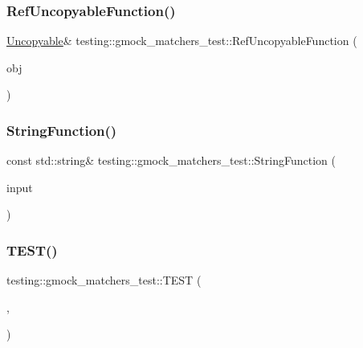 \mbox{\label{namespacetesting_1_1gmock__matchers__test_aa6f7dd285163d5880cfd6685bec8cab4}} 
\subsubsection{\texorpdfstring{RefUncopyableFunction()}{RefUncopyableFunction()}}
{\footnotesize\ttfamily \mbox{\hyperlink{classtesting_1_1gmock__matchers__test_1_1Uncopyable}{Uncopyable}}\& testing\+::gmock\+\_\+matchers\+\_\+test\+::\+Ref\+Uncopyable\+Function (\begin{DoxyParamCaption}\item[{\mbox{\hyperlink{classtesting_1_1gmock__matchers__test_1_1Uncopyable}{Uncopyable}} \&}]{obj }\end{DoxyParamCaption})}

\mbox{\label{namespacetesting_1_1gmock__matchers__test_abe0b3ba3be22e6b973ac6aa226ae85f3}} 
\subsubsection{\texorpdfstring{StringFunction()}{StringFunction()}}
{\footnotesize\ttfamily const std\+::string\& testing\+::gmock\+\_\+matchers\+\_\+test\+::\+String\+Function (\begin{DoxyParamCaption}\item[{const std\+::string \&}]{input }\end{DoxyParamCaption})}

\mbox{\label{namespacetesting_1_1gmock__matchers__test_a4bfc098c6e9ca2766a3dc8f149f62492}} 
\subsubsection{\texorpdfstring{TEST()}{TEST()}\hspace{0.1cm}{\footnotesize\ttfamily [1/350]}}
{\footnotesize\ttfamily testing\+::gmock\+\_\+matchers\+\_\+test\+::\+T\+E\+ST (\begin{DoxyParamCaption}\item[{Monotonic\+Matcher\+Test}]{,  }\item[{Is\+Printable}]{ }\end{DoxyParamCaption})}

